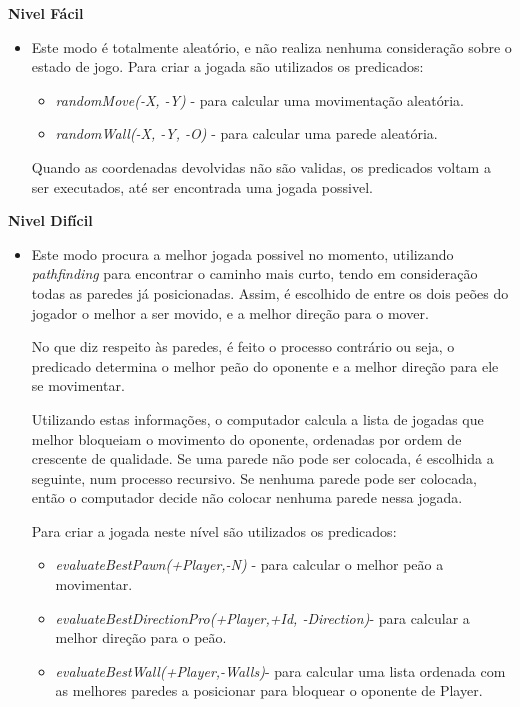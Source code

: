 \documentclass[a4paper]{article}
\begin{document}
\textbf{Nivel Fácil}
\begin{itemize}
\item Este modo é totalmente aleatório, e não realiza nenhuma consideração sobre o estado de jogo. Para criar a jogada são utilizados os predicados:
	\begin{itemize}
		\item \textit{randomMove(-X, -Y)} - para calcular uma movimentação aleatória.
		\item \textit{randomWall(-X, -Y, -O)} - para calcular uma parede aleatória.
	\end{itemize}
	 Quando as coordenadas devolvidas não são validas, os predicados voltam a ser executados, até ser encontrada uma jogada possivel.
\end{itemize}

\textbf{Nivel Difícil}
\begin{itemize}
\item Este modo procura a melhor jogada possivel no momento, utilizando \textit{pathfinding} para encontrar o caminho mais curto, tendo em consideração todas as paredes já posicionadas. Assim, é escolhido de entre os dois peões do jogador o melhor a ser movido, e a melhor direção para o mover.
\par No que diz respeito às paredes, é feito o processo contrário ou seja, o predicado determina o melhor peão do oponente e a melhor direção para ele se movimentar. 
\par Utilizando estas informações, o computador calcula a lista de jogadas que melhor bloqueiam o movimento do oponente, ordenadas por ordem de crescente de qualidade. Se uma parede não pode ser colocada, é escolhida a seguinte, num processo recursivo. Se nenhuma parede pode ser colocada, então o computador decide não colocar nenhuma parede nessa jogada.

 Para criar a jogada neste nível são utilizados os predicados:
 \begin{itemize}
		\item \textit{evaluateBestPawn(+Player,-N)} - para calcular o melhor peão a movimentar.
		\item \textit{evaluateBestDirectionPro(+Player,+Id, -Direction)}-  para calcular a melhor direção para o peão.
		\item \textit{evaluateBestWall(+Player,-Walls)}- para calcular uma lista ordenada com as melhores paredes a posicionar para bloquear o oponente de Player.
	\end{itemize}
\end{itemize}
\end{document}
